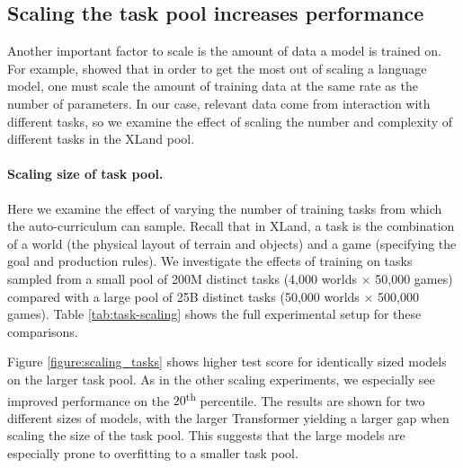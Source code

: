 \subsection{Scaling the task pool increases performance} \label{sec:results_task_scaling}
Another important factor to scale is the amount of data a model is trained on. For example, \citet{hoffmann2022training} showed that in order to get the most out of scaling a language model, one must scale the amount of training data at the same rate as the number of parameters. In our case, relevant data come from interaction with different tasks, so we examine the effect of scaling the number and complexity of different tasks in the XLand pool.

\paragraph{Scaling size of task pool.}

Here we examine the effect of varying the number of training tasks from which the auto-curriculum can sample. Recall that in XLand, a task is the combination of a world (the physical layout of terrain and objects) and a game (specifying the goal and production rules). We investigate the effects of training on tasks sampled from a small pool of 200M distinct tasks (4,000 worlds $\times$ 50,000 games) compared with a large pool of 25B distinct tasks (50,000 worlds $\times$ 500,000 games). Table \ref{tab:task-scaling} shows the full experimental setup for these comparisons.

Figure \ref{figure:scaling_tasks} shows higher test score for identically sized models on the larger task pool. As in the other scaling experiments, we especially see improved performance on the $20$\textsuperscript{th} percentile. The results are shown for two different sizes of models, with the larger Transformer yielding a larger gap when scaling the size of the task pool. This suggests that the large models are especially prone to overfitting to a smaller task pool.


